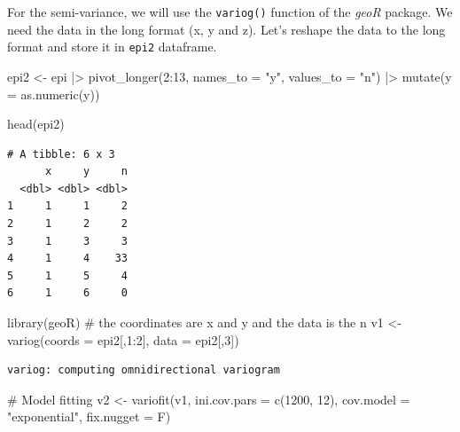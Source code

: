\documentclass[
  letterpaper,
  DIV=11,
  numbers=noendperiod]{scrreprt}
\newenvironment{Shaded}{\begin{snugshade}}{\end{snugshade}}
\newcommand{\AttributeTok}[1]{\textcolor[rgb]{0.40,0.45,0.13}{#1}}
\newcommand{\CommentTok}[1]{\textcolor[rgb]{0.37,0.37,0.37}{#1}}
\newcommand{\DecValTok}[1]{\textcolor[rgb]{0.68,0.00,0.00}{#1}}
\newcommand{\FunctionTok}[1]{\textcolor[rgb]{0.28,0.35,0.67}{#1}}
\newcommand{\NormalTok}[1]{\textcolor[rgb]{0.00,0.23,0.31}{#1}}
\newcommand{\OtherTok}[1]{\textcolor[rgb]{0.00,0.23,0.31}{#1}}
\newcommand{\SpecialCharTok}[1]{\textcolor[rgb]{0.37,0.37,0.37}{#1}}
\newcommand{\StringTok}[1]{\textcolor[rgb]{0.13,0.47,0.30}{#1}}
\begin{document}
For the semi-variance, we will use the \texttt{variog()} function of the
\emph{geoR} package. We need the data in the long format (x, y and z).
Let's reshape the data to the long format and store it in \texttt{epi2}
dataframe.

\begin{Shaded}
\begin{Highlighting}[]
\NormalTok{epi2 }\OtherTok{\textless{}{-}}\NormalTok{ epi }\SpecialCharTok{|\textgreater{}}
  \FunctionTok{pivot\_longer}\NormalTok{(}\DecValTok{2}\SpecialCharTok{:}\DecValTok{13}\NormalTok{,}
               \AttributeTok{names\_to =} \StringTok{"y"}\NormalTok{,}
               \AttributeTok{values\_to =} \StringTok{"n"}\NormalTok{) }\SpecialCharTok{|\textgreater{}}
  \FunctionTok{mutate}\NormalTok{(}\AttributeTok{y =} \FunctionTok{as.numeric}\NormalTok{(y))}

\FunctionTok{head}\NormalTok{(epi2)}
\end{Highlighting}
\end{Shaded}

\begin{verbatim}
# A tibble: 6 x 3
      x     y     n
  <dbl> <dbl> <dbl>
1     1     1     2
2     1     2     2
3     1     3     3
4     1     4    33
5     1     5     4
6     1     6     0
\end{verbatim}

\begin{Shaded}
\begin{Highlighting}[]
\FunctionTok{library}\NormalTok{(geoR)}
\CommentTok{\# the coordinates are x and y and the data is the n}
\NormalTok{v1 }\OtherTok{\textless{}{-}} \FunctionTok{variog}\NormalTok{(}\AttributeTok{coords =}\NormalTok{ epi2[,}\DecValTok{1}\SpecialCharTok{:}\DecValTok{2}\NormalTok{], }\AttributeTok{data =}\NormalTok{ epi2[,}\DecValTok{3}\NormalTok{])}
\end{Highlighting}
\end{Shaded}

\begin{verbatim}
variog: computing omnidirectional variogram
\end{verbatim}

\begin{Shaded}
\begin{Highlighting}[]
\CommentTok{\# Model fitting}
\NormalTok{v2 }\OtherTok{\textless{}{-}} \FunctionTok{variofit}\NormalTok{(v1, }\AttributeTok{ini.cov.pars =} \FunctionTok{c}\NormalTok{(}\DecValTok{1200}\NormalTok{, }\DecValTok{12}\NormalTok{), }
               \AttributeTok{cov.model =} \StringTok{"exponential"}\NormalTok{, }
               \AttributeTok{fix.nugget =}\NormalTok{ F)}
\end{Highlighting}
\end{Shaded}
\end{document}
